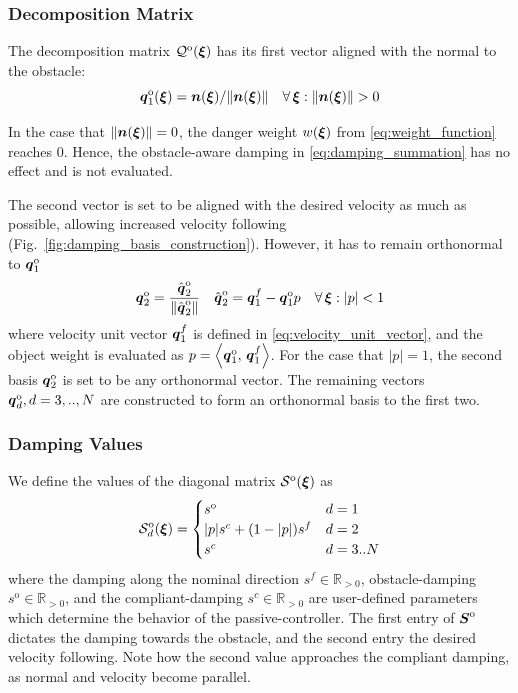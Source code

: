 \subsubsection{Decomposition Matrix}
The decomposition matrix $\mathcal{Q}^{\mathrm{o}}(\boldsymbol{\xi})$ has its first vector aligned with the normal to the obstacle: 
\begin{equation}
    \vecs q_1^{\mathrm{o}}(\vecs\xi) =  \vecs n(\vecs\xi) / \lVert\vecs n(\vecs\xi)\rVert 
    \quad \forall \, \vecs \xi : \lVert\vecs n(\vecs\xi)\rVert  > 0
    \label{eq:first_obstacle_basis}
\end{equation}

In the case that $\lVert\boldsymbol{n}(\boldsymbol{\xi})\rVert = 0$, the danger weight $w(\boldsymbol{\xi})$ from \eqref{eq:weight_function} reaches 0. Hence, the obstacle-aware damping in \eqref{eq:damping_summation} has no effect and is not evaluated.

The second vector is set to be aligned with the desired velocity as much as possible, allowing increased velocity following (Fig.~\ref{fig:damping_basis_construction}). However, it has to remain orthonormal to $\boldsymbol{q}_1^{\mathrm{o}}$
\begin{equation}
  \boldsymbol{q}_2^{\mathrm{o}} = \frac{\hat{\boldsymbol{q}}_2^{\mathrm{o}}}{\| \hat{\boldsymbol{q}}_2^{\mathrm{o}} \|}
  \quad
  \hat{\boldsymbol{q}}_2^{\mathrm{o}} = \boldsymbol{q}_1^{f} - \boldsymbol{q}_1^{\mathrm{o}} p \quad  \forall \, \boldsymbol{\xi} : | p | < 1
\end{equation}
where velocity unit vector $\boldsymbol{q}_1^{f}$ is defined in \eqref{eq:velocity_unit_vector}, and the object weight is evaluated as $p = \left\langle {\boldsymbol{q}_1^{\mathrm{o}}}, \, {\boldsymbol{q}_1^{f}} \right\rangle$. 
For the case that $| p | = 1$, the second basis $\boldsymbol{q}_2^{\mathrm{o}}$ is set to be any orthonormal vector. The remaining vectors $\boldsymbol{q}_d^{\mathrm{o}}, d = 3, .., N$ are constructed to form an orthonormal basis to the first two.

\subsubsection{Damping Values}
We define the values of the diagonal matrix $\mathcal{S}^{\mathrm{o}}(\boldsymbol{\xi})$ as\begin{equation}
  \matd{S}_d^{\mathrm{o}}(\vecs \xi) =
  \begin{cases}
    s^{\mathrm{o}} & d = 1 \\
    | p | s^c + (1 - | p |) s^{f} & d = 2 \\
    s^c & d = 3 .. N
  \end{cases}
  \label{eq:obstacle_damping_values}
\end{equation}
where the damping along the nominal direction $s^{f} \in \mathbb{R}_{>0}$, obstacle-damping $s^{\mathrm{o}} \in \mathbb{R}_{>0}$, and the compliant-damping $s^c \in \mathbb{R}_{>0}$ are user-defined parameters which determine the behavior of the passive-controller. The first entry of $\boldsymbol{S}^{\mathrm{o}}$ dictates the damping towards the obstacle, and the second entry the desired velocity following. Note how the second value approaches the compliant damping, as normal and velocity become parallel.

